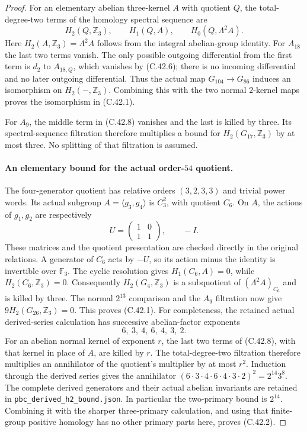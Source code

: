 \begin{proof}
For an elementary abelian three-kernel $A$ with quotient $Q$, the
total-degree-two terms of the homology spectral sequence are
\[
 H_2(Q,\mathbb Z_3),\qquad H_1(Q,A),\qquad
                         H_0(Q,\Lambda^2A).
 \tag{C.42.8}
\]
Here $H_2(A,\mathbb Z_3)=\Lambda^2A$ follows from the integral
abelian-group identity.  For $A_{18}$ the last two terms vanish.
The only possible outgoing differential from the first term is
$d_2$ to $A_{18,Q}$, which vanishes by (C.42.6); there is no incoming
differential and no later outgoing differential.  Thus the actual map
$G_{104}\to G_{86}$ induces an isomorphism on $H_2(-,\mathbb Z_3)$.
Combining this with the two normal $2$-kernel maps proves the
isomorphism in (C.42.1).

For $A_9$, the middle term in (C.42.8) vanishes and the last is killed
by three.  Its spectral-sequence filtration therefore multiplies a
bound for $H_2(G_{17},\mathbb Z_3)$ by at most three.  No splitting
of that filtration is assumed.

\paragraph{An elementary bound for the actual order-$54$ quotient.}
The four-generator quotient has relative orders $(3,2,3,3)$ and
trivial power words.  Its actual subgroup $A=\langle g_3,g_4\rangle$
is $C_3^2$, with quotient $C_6$.  On $A$, the actions of $g_1,g_2$
are respectively
\[
             U=\begin{pmatrix}1&0\\1&1\end{pmatrix},
             \qquad -I.
 \tag{C.42.9}
\]
These matrices and the quotient presentation are checked directly in
the original relations.  A generator of $C_6$ acts by $-U$, so its
action minus the identity is invertible over $\mathbb F_3$.
The cyclic resolution gives $H_1(C_6,A)=0$, while
$H_2(C_6,\mathbb Z_3)=0$.  Consequently $H_2(G_4,\mathbb Z_3)$ is
a subquotient of $(\Lambda^2A)_{C_6}$ and is killed by three.
The normal $2^{13}$ comparison and the $A_9$ filtration now give
$9H_2(G_{26},\mathbb Z_3)=0$.  This proves (C.42.1).
For completeness, the retained actual derived-series calculation has
successive abelian-factor exponents
\[
                         6,\ 3,\ 4,\ 6,\ 4,\ 3,\ 2.
\]
For an abelian normal kernel of exponent $r$, the last two terms of
(C.42.8), with that kernel in place of $A$, are killed by $r$.
The total-degree-two filtration therefore multiplies an annihilator
of the quotient's multiplier by at most $r^2$.  Induction through
the derived series gives the annihilator
$(6\cdot3\cdot4\cdot6\cdot4\cdot3\cdot2)^2=2^{14}3^8$.
The complete derived generators and their actual abelian invariants
are retained in \texttt{pbc\_derived\_h2\_bound.json}.
In particular the two-primary bound is $2^{14}$.  Combining it
with the sharper three-primary calculation, and using that finite-group
positive homology has no other primary parts here, proves (C.42.2).


\end{proof}
